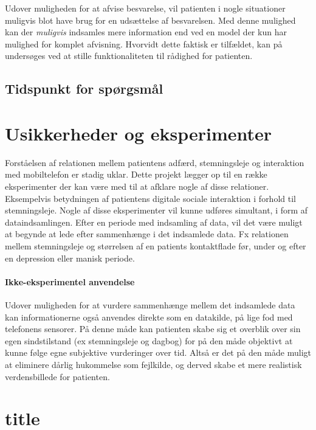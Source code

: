 Udover muligheden for at afvise besvarelse, vil patienten i nogle situationer muligvis blot have brug for en udsættelse af besvarelsen.
Med denne mulighed kan der \textit{muligvis} indsamles mere information end ved en model der kun har mulighed for komplet afvisning.
Hvorvidt dette faktisk er tilfældet, kan på undersøges ved at stille funktionaliteten til rådighed for patienten.

\subsection{Tidspunkt for spørgsmål}


\section{Usikkerheder og eksperimenter}
Forståelsen af relationen mellem patientens adfærd, stemningsleje og interaktion med mobiltelefon er stadig uklar.
Dette projekt lægger op til en række eksperimenter der kan være med til at afklare nogle af disse relationer.
Eksempelvis betydningen af patientens digitale sociale interaktion i forhold til stemningsleje.
Nogle af disse eksperimenter vil kunne udføres simultant, i form af dataindsamlingen.
Efter en periode med indsamling af data, vil det være muligt at begynde at lede efter sammenhænge i det indsamlede data.
Fx relationen mellem stemningsleje og størrelsen af en patients kontaktflade før, under og efter en depression eller manisk periode.

\paragraph{Ikke-eksperimentel anvendelse}
Udover muligheden for at vurdere sammenhænge mellem det indsamlede data kan informationerne også anvendes direkte som en datakilde, på lige fod med telefonens sensorer.
På denne måde kan patienten skabe sig et overblik over sin egen sindstilstand (ex stemningsleje og dagbog) for på den måde objektivt at kunne følge egne subjektive vurderinger over tid.
Altså er det på den måde muligt at eliminere dårlig hukommelse som fejlkilde, og derved skabe et mere realistisk verdensbillede for patienten.

\section{title}
